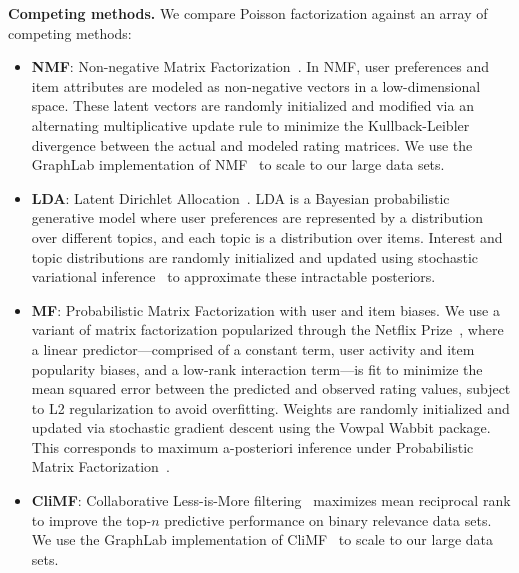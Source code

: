 {\bf Competing methods.} We compare Poisson factorization against an array of
competing methods:
\begin{itemize}
  \item {\bf NMF}: Non-negative Matrix
    Factorization~\cite{Lee:1999}. In NMF, user preferences and item
    attributes are modeled as non-negative vectors in a
    low-dimensional space. These latent vectors are randomly
    initialized and modified via an alternating multiplicative update
    rule to minimize the Kullback-Leibler divergence between the
    actual and modeled rating matrices. We use the GraphLab
    implementation of NMF~\cite{kyrola2012graphchi} to scale to our
    large data sets.

  \item {\bf LDA}: Latent Dirichlet Allocation~\cite{Blei:2003b}. LDA
    is a Bayesian probabilistic generative model where user preferences
    are represented by a distribution over different topics, and each
    topic is a distribution over items. Interest and topic
    distributions are randomly initialized and updated using
    stochastic variational inference~\cite{Hoffman:2013} to
    approximate these intractable posteriors.

  \item {\bf MF}: Probabilistic Matrix Factorization with user and
    item biases. We use a variant of matrix factorization popularized
    through the Netflix Prize~\cite{Koren:2009}, where a linear
    predictor---comprised of a constant term, user activity and item
    popularity biases, and a low-rank interaction term---is fit to
    minimize the mean squared error between the predicted and observed
    rating values, subject to L2 regularization to avoid
    overfitting. Weights are randomly initialized and updated via
    stochastic gradient descent using the Vowpal Wabbit package. This
    corresponds to maximum a-posteriori inference under Probabilistic
    Matrix Factorization~\cite{Salakhutdinov:2008a}.

\item {\bf CliMF}: Collaborative Less-is-More
  filtering~\cite{shi2012climf} maximizes mean reciprocal rank to
  improve the top-$n$ predictive performance on binary relevance data
  sets. We use the GraphLab implementation of
  CliMF~\cite{kyrola2012graphchi} to scale to our large data sets.
\end{itemize}

